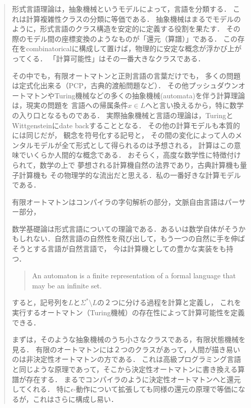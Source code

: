 \documentclass[uplatex, dvipdfmx]{jsreport}
\begin{document}
\begin{quotation}
    形式言語理論は，抽象機械というモデルによって，言語を分類する．
    これは計算複雑性クラスの分類に等価である．
    抽象機械はまるでモデルのように，形式言語のクラス構造を安定的に定義する役割を果たす．
    その際のモデル間の座標変換のようなものが「還元（算譜）」である．
    この存在をcombinatoricalに構成して置けば，物理的に安定な概念が浮かび上がってくる．
    「計算可能性」はその一番大きなクラスである．

    その中でも，有限オートマトンと正則言語の言葉だけでも，
    多くの問題は定式化出来る（PCP，古典的渡船問題など）．
    その他プッシュダウンオートマトンやTuring機械などの多くの抽象機械(automata)を伴う計算理論は，現実の問題を
    言語への帰属条件$x\in L$へと言い換えるから，特に数学の入り口となるものである．
    実際抽象機械と言語の理論は，TuringとWittgensteinにdate backすることとなる．
    その他の計算モデルも本質的には同じだが，
    観念を符号化する記号と，
    その間の変化によって人のメンタルモデルが全て形式として得られるのは予想される，
    計算はこの意味でいくらか人間的な概念である．
    おそらく，高度な数学性に特徴付けられて，数学の上で
    夢想される計算機自然の法界であり，古典計算機も量子計算機も
    その物理学的な流出だと思える．私の一番好きな計算モデルである．

    有限オートマトンはコンパイラの字句解析の部分，文脈自由言語はパーサー部分，

    数学基礎論は形式言語についての理論である．あるいは数学自体がそうかもしれない．自然言語の自然性を飛び出して，もう一つの自然に手を伸ばそうとする言語が自然言語で，
    今は計算機としての豊かな実装をも持つ．
    \begin{quote}
    An automaton is a finite representation of a formal language that may be an infinite set.
    \end{quote}

    すると，記号列を$L$と$\Sigma^*\setminus L$の２つに分ける過程を計算と定義し，
    これを実行するオートマトン（Turing機械）の存在性によって計算可能性を定義できる．

    まずは，そのような抽象機械のうち小さなクラスである，有限状態機械を見る．
    有限のオートマトンには２つのクラスがあって，人間が描き易いのは非決定性オートマトンの方である．
    これは高級プログラミング言語と同じような原理であって，そこから決定性オートマトンに書き換える算譜が存在する．
    まるでコンパイラのように決定性オートマトンへと還元してくれる．
    特に$\epsilon$-動作について拡張しても同様の還元の原理で等価になるが，これはさらに構成し易い．
\end{quotation}
\end{document}
